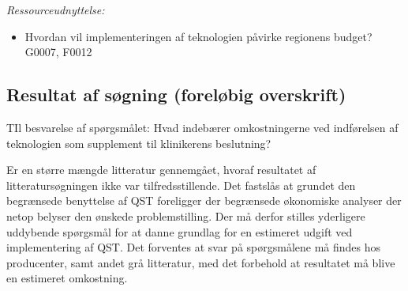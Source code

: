 \textit{Ressourceudnyttelse:}
\begin{itemize}
	\item Hvordan vil implementeringen af teknologien påvirke regionens budget? G0007, F0012
\end{itemize}
%
%

\subsection*{Resultat af søgning (foreløbig overskrift)}
TIl besvarelse af spørgsmålet: Hvad indebærer omkostningerne ved indførelsen af teknologien som supplement til klinikerens beslutning? 

Er en større mængde litteratur gennemgået, hvoraf resultatet af litteratursøgningen ikke var tilfredsstillende. Det fastslås at grundet den begrænsede benyttelse af QST foreligger der begrænsede økonomiske analyser der netop belyser den ønskede problemstilling. Der må derfor stilles yderligere uddybende spørgsmål for at danne grundlag for en estimeret udgift ved implementering af QST. Det forventes at svar på spørgsmålene må findes hos producenter, samt andet grå litteratur, med det forbehold at resultatet må blive en estimeret omkostning. 

